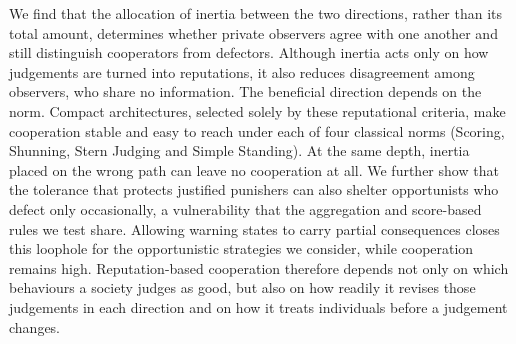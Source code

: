 We find that the allocation of inertia between the two directions, rather than its total amount, determines whether private observers agree with one another and still distinguish cooperators from defectors. Although inertia acts only on how judgements are turned into reputations, it also reduces disagreement among observers, who share no information. The beneficial direction depends on the norm. Compact architectures, selected solely by these reputational criteria, make cooperation stable and easy to reach under each of four classical norms (Scoring, Shunning, Stern Judging and Simple Standing). At the same depth, inertia placed on the wrong path can leave no cooperation at all. We further show that the tolerance that protects justified punishers can also shelter opportunists who defect only occasionally, a vulnerability that the aggregation and score-based rules we test share. Allowing warning states to carry partial consequences closes this loophole for the opportunistic strategies we consider, while cooperation remains high. Reputation-based cooperation therefore depends not only on which behaviours a society judges as good, but also on how readily it revises those judgements in each direction and on how it treats individuals before a judgement changes.
